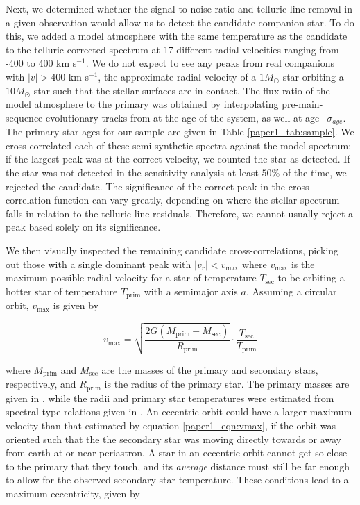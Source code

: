 Next, we determined whether the signal-to-noise ratio and telluric line removal in a given observation would allow us to detect the candidate companion star.
To do this, we added a model atmosphere with the
same temperature as the candidate to the telluric-corrected spectrum at 17 different radial
velocities ranging from -400 to 400 km s$^{-1}$. We do not expect to see any
peaks from real companions with $|v| > 400$ km s$^{-1}$, the approximate
radial velocity of a $1 M_{\odot}$ star orbiting a $10 M_{\odot}$ star
such that the stellar surfaces are in contact. The flux ratio of the model atmosphere to the primary was obtained by
interpolating pre-main-sequence evolutionary tracks from
\cite{Landin2008} at the age of the system, as well at age$\pm
\sigma_{age}$. The primary star ages for our sample are given in Table
\ref{paper1_tab:sample}. We cross-correlated each of these semi-synthetic
spectra against the model spectrum; if the largest
peak was at the correct velocity, we counted the star as
detected. If the star was not detected in the sensitivity
analysis at least $50\%$ of the time, we rejected the candidate.
The significance of the correct peak in the cross-correlation 
function can vary greatly, depending on where the stellar spectrum falls in 
relation to the telluric line residuals. Therefore, we cannot usually reject a peak
based solely on its significance.

We then visually inspected the remaining candidate cross-correlations,
picking out those with a single dominant peak with $|v_r| < v_\mathrm{max}$
where $v_\mathrm{max}$ is the maximum possible radial velocity for a star of
temperature $T_\mathrm{sec}$ to be orbiting a hotter star of temperature
$T_\mathrm{prim}$ with a semimajor axis $a$. Assuming a circular orbit,
$v_\mathrm{max}$ is given by

\begin{equation}
v_\mathrm{max} = \sqrt{\frac{2G(M_\mathrm{prim} + M_\mathrm{sec})}{R_\mathrm{prim}}} \cdot \frac{T_\mathrm{sec}}{T_\mathrm{prim}}
\label{paper1_eqn:vmax}
\end{equation}

where $M_\mathrm{prim}$ and $M_\mathrm{sec}$ are the masses of the primary and
secondary stars, respectively, and $R_\mathrm{prim}$ is the radius of the
primary star. The primary masses are given in \cite{Tetzlaff2010}, while
the radii and primary star temperatures were estimated from spectral type relations given in
\cite{CarrollOstlie}. An eccentric orbit could have a larger maximum velocity than
that estimated by equation \ref{paper1_eqn:vmax}, if the orbit was oriented
such that the the secondary star was moving directly towards or away from earth at or near
periastron. A star in an eccentric orbit cannot get so close to the
primary that they touch, and its \emph{average} distance must still be
far enough to allow for the observed secondary star temperature. These
conditions lead to a maximum eccentricity, given by

